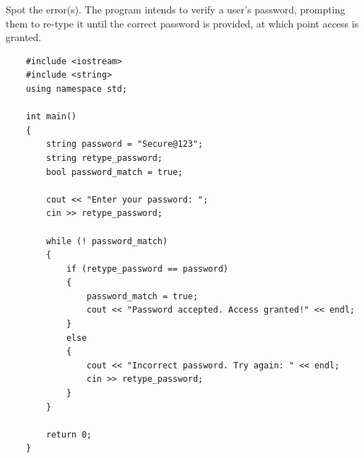 \begin{problem}
    Spot the error(s). The program intends to verify a user's password, prompting them to re-type it until the correct password is provided, at which point access is granted.

    \begin{verbatim}
    #include <iostream>
    #include <string>
    using namespace std;
    
    int main()
    {
        string password = "Secure@123";
        string retype_password;
        bool password_match = true;
    
        cout << "Enter your password: ";
        cin >> retype_password;
    
        while (! password_match)
        {
            if (retype_password == password)
            {
                password_match = true;
                cout << "Password accepted. Access granted!" << endl;
            }
            else
            {
                cout << "Incorrect password. Try again: " << endl;
                cin >> retype_password;
            }
        }
    
        return 0;
    }
    \end{verbatim}
\end{problem}

